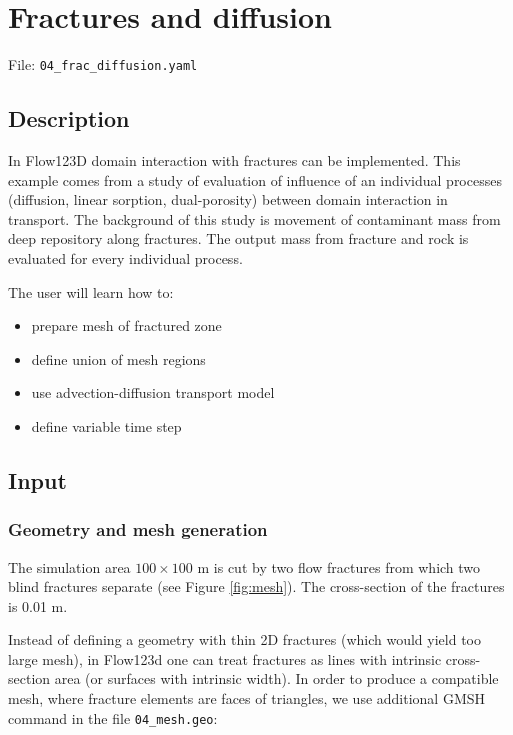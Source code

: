 \section{Fractures and diffusion}\label{fractures-and-diffusion}

File: \texttt{04\_frac\_diffusion.yaml}

\subsection{Description}\label{description}

In Flow123D domain interaction with fractures can be implemented. This
example comes from a study of evaluation of influence of an individual
processes (diffusion, linear sorption, dual-porosity) between domain
interaction in transport. The background of this study is movement of
contaminant mass from deep repository along fractures. The output mass
from fracture and rock is evaluated for every individual process.

The user will learn how to:

\begin{itemize}
\tightlist
\item
  prepare mesh of fractured zone
\item
  define union of mesh regions
\item
  use advection-diffusion transport model
\item
  define variable time step
\end{itemize}

\subsection{Input}\label{input}

\subsubsection{Geometry and mesh
generation}\label{geometry-and-mesh-generation}

The simulation area \(100 \times 100\) m is cut by two flow fractures
from which two blind fractures separate (see Figure \ref{fig:mesh}). The
cross-section of the fractures is 0.01 m.

Instead of defining a geometry with thin 2D fractures (which would yield
too large mesh), in Flow123d one can treat fractures as lines with
intrinsic cross-section area (or surfaces with intrinsic width). In
order to produce a compatible mesh, where fracture elements are faces of
triangles, we use additional GMSH command in the file
\texttt{04\_mesh.geo}:

